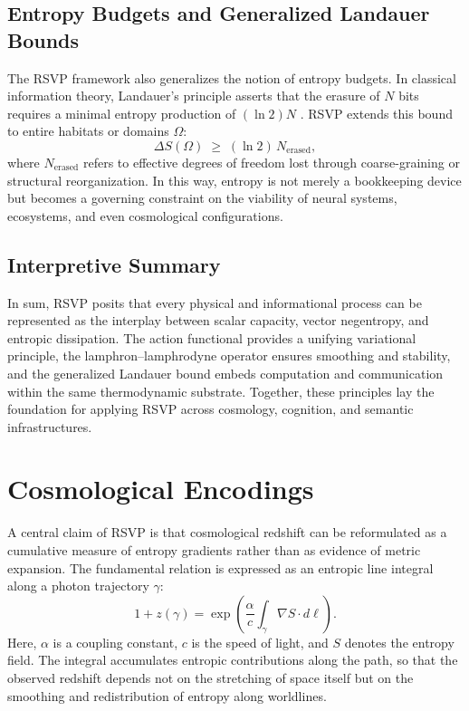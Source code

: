 \documentclass[12pt]{article}
\begin{document}
\subsection{Entropy Budgets and Generalized Landauer Bounds}
The RSVP framework also generalizes the notion of entropy budgets. In classical information theory, Landauer’s principle asserts that the erasure of $N$ bits requires a minimal entropy production of $(\ln 2)N$ \cite{Landauer1961,Bennett1982}. RSVP extends this bound to entire habitats or domains $\Omega$:
\begin{equation}
\Delta S(\Omega) \;\ge\; (\ln 2)\, N_{\mathrm{erased}},
\end{equation}
where $N_{\mathrm{erased}}$ refers to effective degrees of freedom lost through coarse-graining or structural reorganization. In this way, entropy is not merely a bookkeeping device but becomes a governing constraint on the viability of neural systems, ecosystems, and even cosmological configurations.

\subsection{Interpretive Summary}
In sum, RSVP posits that every physical and informational process can be represented as the interplay between scalar capacity, vector negentropy, and entropic dissipation. The action functional provides a unifying variational principle, the lamphron–lamphrodyne operator ensures smoothing and stability, and the generalized Landauer bound embeds computation and communication within the same thermodynamic substrate. Together, these principles lay the foundation for applying RSVP across cosmology, cognition, and semantic infrastructures.


\section{Cosmological Encodings}

A central claim of RSVP is that cosmological redshift can be reformulated as a cumulative measure of entropy gradients rather than as evidence of metric expansion. The fundamental relation is expressed as an entropic line integral along a photon trajectory $\gamma$:  
\begin{equation}
1+z(\gamma) = \exp\!\left(\frac{\alpha}{c}\int_\gamma \nabla S \cdot d\ell\right).
\end{equation}
Here, $\alpha$ is a coupling constant, $c$ is the speed of light, and $S$ denotes the entropy field. The integral accumulates entropic contributions along the path, so that the observed redshift depends not on the stretching of space itself but on the smoothing and redistribution of entropy along worldlines.  
\end{document}
